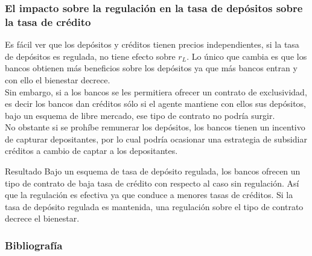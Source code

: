 \documentclass[10pt, xcolor=table, x11names]{beamer}
\begin{document}
\begin{frame}
    \frametitle{{\normalsize El impacto sobre la regulación en la tasa de depósitos sobre la tasa de crédito} {}}
   Es fácil ver que los depósitos y créditos tienen precios independientes, si la tasa de depósitos es regulada, no tiene efecto sobre $r_{L}$. Lo único que cambia es que los bancos obtienen más beneficios sobre los depósitos ya que más bancos entran y con ello el bienestar decrece.\\
   
    Sin embargo, si a los bancos se les permitiera ofrecer un contrato de exclusividad, es decir los bancos dan créditos sólo si el agente mantiene con ellos sus depósitos, bajo un esquema de libre mercado, ese tipo de contrato no podría surgir.\\
    No obstante si se prohíbe remunerar los depósitos, los bancos tienen un incentivo de capturar depositantes, por lo cual podría ocasionar una estrategia de subsidiar créditos a cambio de captar a los depositantes.
  
  
  \begin{block} {Resultado}
      Bajo un esquema de tasa de depósito regulada, los bancos ofrecen un tipo de contrato de baja tasa de crédito con respecto al caso sin regulación. Así que la regulación es efectiva ya que conduce a menores tasas de créditos. Si la tasa de depósito regulada es mantenida, una regulación sobre el tipo de contrato decrece el bienestar. 
      
  \end{block}	

  
\end{frame}


\begin{frame}[allowframebreaks]
    \frametitle{{\large 
            Bibliografía}}
    \renewcommand{\refname}{Referencias}
    
    
\end{frame}
\end{document}
